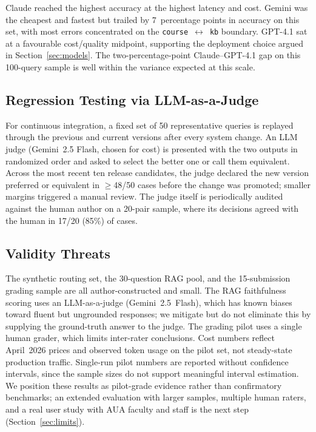 \documentclass[conference]{IEEEtran}
\begin{document}
Claude reached the highest accuracy at the highest latency and cost. Gemini was the cheapest and fastest but trailed by 7~percentage points in accuracy on this set, with most errors concentrated on the \texttt{course}~$\leftrightarrow$~\texttt{kb} boundary. GPT-4.1 sat at a favourable cost/quality midpoint, supporting the deployment choice argued in Section~\ref{sec:models}. The two-percentage-point Claude--GPT-4.1 gap on this 100-query sample is well within the variance expected at this scale.

\subsection{Regression Testing via LLM-as-a-Judge}

For continuous integration, a fixed set of 50 representative queries is replayed through the previous and current versions after every system change. An LLM judge (Gemini~2.5 Flash, chosen for cost) is presented with the two outputs in randomized order and asked to select the better one or call them equivalent. Across the most recent ten release candidates, the judge declared the new version preferred or equivalent in $\geq$48/50 cases before the change was promoted; smaller margins triggered a manual review. The judge itself is periodically audited against the human author on a 20-pair sample, where its decisions agreed with the human in 17/20 (85\%) of cases.

\subsection{Validity Threats}

The synthetic routing set, the 30-question RAG pool, and the 15-submission grading sample are all author-constructed and small. The RAG faithfulness scoring uses an LLM-as-a-judge (Gemini~2.5~Flash), which has known biases toward fluent but ungrounded responses; we mitigate but do not eliminate this by supplying the ground-truth answer to the judge. The grading pilot uses a single human grader, which limits inter-rater conclusions. Cost numbers reflect April~2026 prices and observed token usage on the pilot set, not steady-state production traffic. Single-run pilot numbers are reported without confidence intervals, since the sample sizes do not support meaningful interval estimation. We position these results as pilot-grade evidence rather than confirmatory benchmarks; an extended evaluation with larger samples, multiple human raters, and a real user study with AUA faculty and staff is the next step (Section~\ref{sec:limits}).
\end{document}
